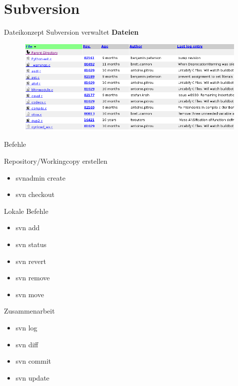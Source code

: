 \documentclass[presentation]{beamer}
\begin{document}
\section{Subversion}
\begin{frame}{Dateikonzept}
  Subversion verwaltet \textbf{Dateien}
  \begin{figure}
    \centering
    \includegraphics[width=\textwidth]{img/svn-files}
  \end{figure}
\end{frame}
\begin{frame}{Befehle}
\end{frame}
\begin{frame}{Repository/Workingcopy erstellen}
  \begin{itemize}[<+- | alert@+>]
  \item svnadmin create
  \item svn checkout
  \end{itemize}
\end{frame}
\begin{frame}{Lokale Befehle}
  \begin{itemize}[<+- | alert@+>]
  \item svn add
  \item svn status
  \item svn revert
  \item svn remove
  \item svn move
  \end{itemize}
\end{frame}
\begin{frame}{Zusammenarbeit}
  \begin{itemize}[<+- | alert@+>]
  \item svn log
  \item svn diff
  \item svn commit
  \item svn update
  \end{itemize}
\end{frame}
\end{document}
